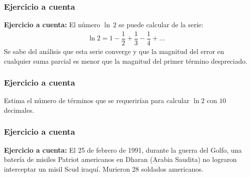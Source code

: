 \documentclass[12pt]{beamer}
\begin{document}
\begin{frame}
\frametitle{Ejercicio a cuenta}
\textbf{Ejercicio a cuenta: } El número $\ln \, 2$ se puede calcular de la serie:
\begin{align*}
\ln 2 = 1 - \dfrac{1}{2} + \dfrac{1}{3} -\dfrac{1}{4} + \ldots
\end{align*}
Se sabe del análisis que esta serie converge y que la magnitud del error en cualquier suma parcial es menor que la magnitud del primer término despreciado.
\end{frame}
\begin{frame}
\frametitle{Ejercicio a cuenta}
Estima el número de términos que se requerirían para calcular $\ln 2$ con $10$ decimales.
\end{frame}
\begin{frame}
\frametitle{Ejercicio a cuenta}
\textbf{Ejercicio a cuenta: } El 25 de febrero de 1991, durante la guerra del Golfo, una batería de misiles Patriot americanos en Dharan (Arabia Saudita) no lograron interceptar un misil Scud iraquí. Murieron 28 soldados americanos.
\end{frame}
\end{document}
